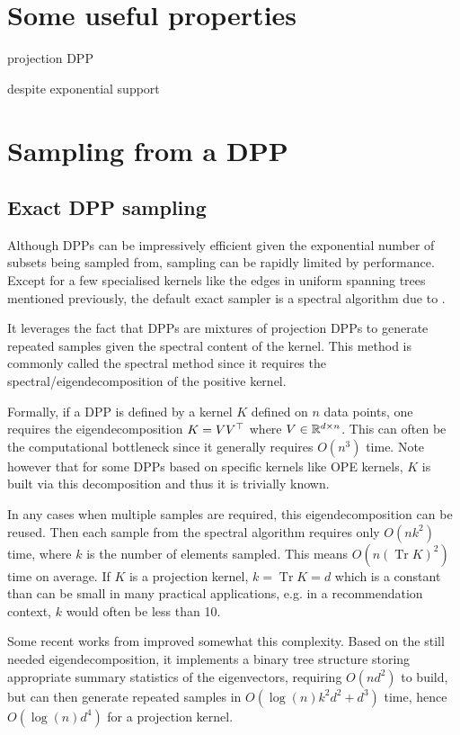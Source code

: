 \section{Some useful properties}
projection DPP

despite exponential support




\section{Sampling from a DPP}
\subsection{Exact DPP sampling}


Although DPPs can be impressively efficient given the exponential number of subsets being sampled from, sampling can be rapidly limited by performance. 
Except for a few specialised kernels like the edges in uniform spanning trees mentioned previously, the default exact sampler is a spectral algorithm due to \cite{hough2006_hkpv}.

It leverages the fact that DPPs are mixtures of projection DPPs to generate repeated samples given the spectral content of the kernel. This method is commonly called the spectral method since it requires the spectral/eigendecomposition of the positive kernel. 

Formally, if a DPP is defined by a kernel $K$ defined on $n$ data points, one requires the eigendecomposition $K= V V^\top$  where $V \in \mathbb{R}^{d \times n}$. 
This can often be the computational bottleneck since it generally requires $O(n^3)$ time. Note however that for some DPPs based on specific kernels like OPE kernels, $K$ is built via this decomposition and thus it is trivially known.

In any cases when multiple samples are required, this eigendecomposition can be reused. Then each sample from the spectral algorithm requires only $O(n k^2)$ time, where $k$ is the number of elements sampled. This means $O(n (\operatorname{Tr} K)^2)$ time on average. If $K$ is a projection kernel, $k = \operatorname{Tr} K = d$ which is a constant than can be small in many practical applications, e.g. in a recommendation context, $k$ would often be less than 10.

Some recent works from \cite{gillenwater2019_treebased_fast_dpp_sampling} improved somewhat this complexity. Based on the still needed eigendecomposition, it implements a binary tree structure storing appropriate summary statistics of the eigenvectors, requiring $O(n d^2)$ to build, but can then generate repeated
samples in $O(\log(n)k^2d^2 + d^3)$ time, hence $O(\log(n)d^4)$ for a projection kernel.

